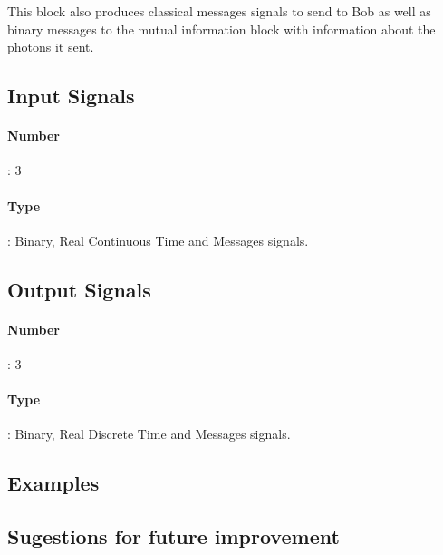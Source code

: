 This block also produces classical messages signals to send to Bob as well as binary messages to the mutual information block with information about the photons it sent.

\subsection*{Input Signals}
\paragraph*{Number}: 3
\paragraph*{Type}: Binary, Real Continuous Time and Messages signals.

\subsection*{Output Signals}
\paragraph*{Number}: 3
\paragraph*{Type}: Binary, Real Discrete Time and Messages signals.

\subsection*{Examples}


\subsection*{Sugestions for future improvement}



